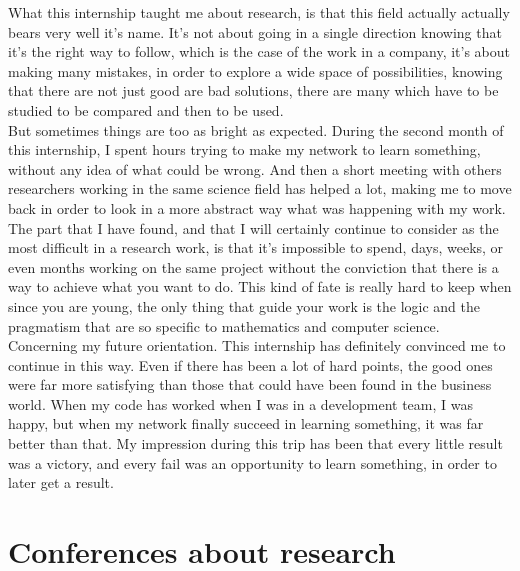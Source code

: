 \documentclass{report}
\begin{document}
	What this internship taught me about research, is that this field actually actually bears very well it's name. It's not about going in a single direction knowing that it's the right way to follow, which is the case of the work in a company, it's about making many mistakes, in order to explore a wide space of possibilities, knowing that there are not just good are bad solutions, there are many which have to be studied to be compared and then to be used.\\
	
	But sometimes things are too as bright as expected. During the second month of this internship, I spent hours trying to make my network to learn something, without any idea of what could be wrong. And then a short meeting with others researchers working in the same science field has helped a lot, making me to move back in order to look in a more abstract way what was happening with my work. The part that I have found, and that I will certainly continue to consider as the most difficult in a research work, is that it's impossible to spend, days, weeks, or even months working on the same project without the conviction that there is a way to achieve what you want to do. This kind of fate is really hard to keep when since you are young, the only thing that guide your work is the logic and the pragmatism that are so specific to mathematics and computer science.\\
	
	Concerning my future orientation. This internship has definitely convinced me to continue in this way. Even if there has been a lot of hard points, the good ones were far more satisfying than those that could have been found in the business world. When my code has worked when I was in a development team, I was happy, but when my network finally succeed in learning something, it was far better than that. My impression during this trip has been that every little result was a victory, and every fail was an opportunity to learn something, in order to later get a result.
	
	\section{Conferences about research}
	
\end{document}
